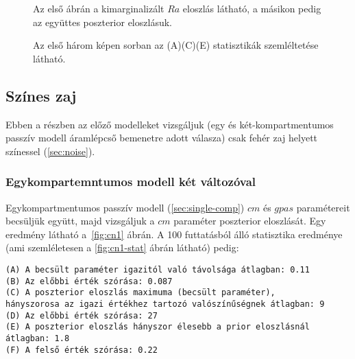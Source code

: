 \begin{figure}
	\hfill
	\hfill
	\hfill
	\caption[Kétkompartmentumos, fehér zaj, két paraméteres becslés]{Az első ábrán a kimarginalizált $Ra$ eloszlás látható, a másikon pedig az együttes poszterior eloszlásuk. }%
	\label{fig:wn3}
\end{figure}

\begin{figure}
	\hfill
	\hfill
	\hfill
	\vfill
	\caption[Kétkompartmentumos, fehér zaj, két paraméter statisztika]{Az első három képen sorban az (A)(C)(E) statisztikák szemléltetése látható.}%
	\label{fig:wn3-stat}
\end{figure}

\FloatBarrier
\subsection{Színes zaj}
Ebben a részben az előző modelleket vizsgáljuk (egy és két-kompartmentumos passzív modell áramlépcső bemenetre adott válasza) csak fehér zaj helyett színessel (\ref{sec:noise}).
\subsubsection{Egykompartemntumos modell két változóval}
Egykompartmentumos passzív modell (\ref{sec:single-comp}) $cm$ és $gpas$ paramétereit becsüljük együtt, majd vizsgáljuk a $cm$ paraméter poszterior eloszlását. Egy eredmény látható a~\ref{fig:cn1} ábrán. A 100 futtatásból álló statisztika eredménye (ami szemléletesen a \ref{fig:cn1-stat} ábrán látható) pedig:

\begin{verbatim}
(A) A becsült paraméter igazitól való távolsága átlagban: 0.11
(B) Az előbbi érték szórása: 0.087
(C) A poszterior eloszlás maximuma (becsült paraméter), 
hányszorosa az igazi értékhez tartozó valószínűségnek átlagban: 9
(D) Az előbbi érték szórása: 27
(E) A poszterior eloszlás hányszor élesebb a prior eloszlásnál átlagban: 1.8
(F) A felső érték szórása: 0.22
\end{verbatim}

